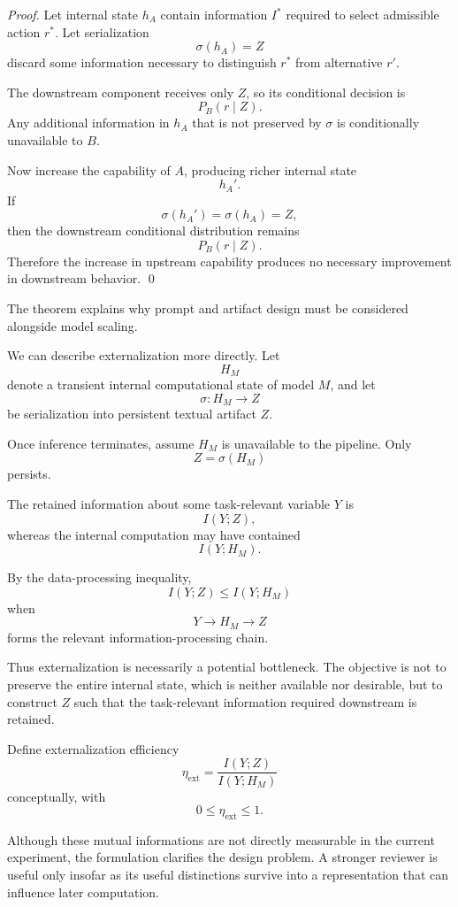 \documentclass[11pt]{article}
\begin{document}
\begin{proof}
Let internal state \(h_A\) contain information \(I^\ast\) required to select admissible action \(r^\ast\). Let serialization
\[
    \sigma(h_A)=Z
\]
discard some information necessary to distinguish \(r^\ast\) from alternative \(r'\).

The downstream component receives only \(Z\), so its conditional decision is
\[
    P_B(r\mid Z).
\]
Any additional information in \(h_A\) that is not preserved by \(\sigma\) is conditionally unavailable to \(B\).

Now increase the capability of \(A\), producing richer internal state
\[
    h_A'.
\]
If
\[
    \sigma(h_A')=\sigma(h_A)=Z,
\]
then the downstream conditional distribution remains
\[
    P_B(r\mid Z).
\]
Therefore the increase in upstream capability produces no necessary improvement in downstream behavior. \qed
\end{proof}

The theorem explains why prompt and artifact design must be considered alongside model scaling.

We can describe externalization more directly. Let
\[
    H_M
\]
denote a transient internal computational state of model \(M\), and let
\[
    \sigma:H_M\rightarrow Z
\]
be serialization into persistent textual artifact \(Z\).

Once inference terminates, assume \(H_M\) is unavailable to the pipeline. Only
\[
    Z=\sigma(H_M)
\]
persists.

The retained information about some task-relevant variable \(Y\) is
\[
    I(Y;Z),
\]
whereas the internal computation may have contained
\[
    I(Y;H_M).
\]

By the data-processing inequality,
\[
    I(Y;Z)
    \leq
    I(Y;H_M)
\]
when
\[
    Y\rightarrow H_M\rightarrow Z
\]
forms the relevant information-processing chain.

Thus externalization is necessarily a potential bottleneck. The objective is not to preserve the entire internal state, which is neither available nor desirable, but to construct \(Z\) such that the task-relevant information required downstream is retained.

Define externalization efficiency
\[
    \eta_{\mathrm{ext}}
    =
    \frac{I(Y;Z)}
         {I(Y;H_M)}
\]
conceptually, with
\[
    0\leq\eta_{\mathrm{ext}}\leq1.
\]

Although these mutual informations are not directly measurable in the current experiment, the formulation clarifies the design problem. A stronger reviewer is useful only insofar as its useful distinctions survive into a representation that can influence later computation.
\end{document}
